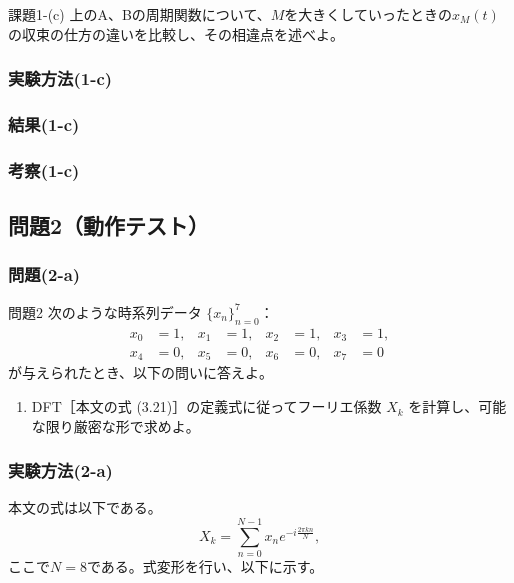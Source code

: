 \documentclass[a4j]{jarticle}
\begin{document}
\begin{itembox}[l]{課題1-(c)}
上のA、Bの周期関数について、$M$を大きくしていったときの$x_M(t)$の収束の仕方の違いを比較し、その相違点を述べよ。
\end{itembox}

\subsubsection{実験方法(1-c)}

\subsubsection{結果(1-c)}

\subsubsection{考察(1-c)}

\subsection{問題2（動作テスト）}
\subsubsection{問題(2-a)}

\begin{itembox}[l]{問題2}
  次のような時系列データ $\{x_n\}_{n=0}^{7}$：
  \[
    \begin{aligned}
      x_0&=1, & x_1&=1, & x_2&=1, & x_3&=1,\\
      x_4&=0, & x_5&=0, & x_6&=0, & x_7&=0
    \end{aligned}
  \]
  が与えられたとき、以下の問いに答えよ。
  \begin{enumerate}
    \item[(a)] DFT［本文の式 (3.21)］の定義式に従ってフーリエ係数 $X_k$ を計算し、可能な限り厳密な形で求めよ。
  \end{enumerate}
\end{itembox}

\subsubsection{実験方法(2-a)}

本文の式は以下である。
\begin{equation}
  X_k=\sum_{n=0}^{N-1}x_n e^{-i\frac{2\pi kn}{N}},
  \tag{3.21}
  \label{eq:dft-definition}
\end{equation}
ここで$N=8$である。式変形を行い、以下に示す。
\end{document}
